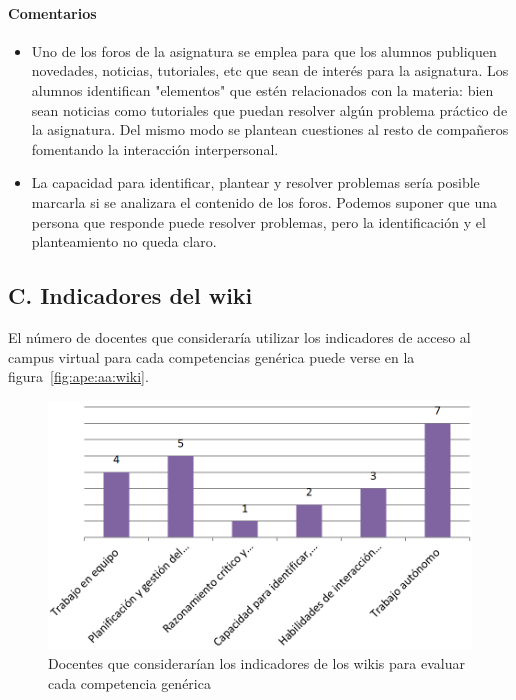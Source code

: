 \paragraph*{Comentarios}

\begin{itemize}
\item Uno de los foros de la asignatura se emplea para que los alumnos publiquen novedades, noticias, tutoriales, etc que sean de interés para la asignatura. Los alumnos identifican "elementos" que estén relacionados con la materia: bien sean noticias como tutoriales que puedan resolver algún problema práctico de la asignatura. Del mismo modo se plantean cuestiones al resto de compañeros fomentando la interacción interpersonal.
\item La capacidad para identificar, plantear y resolver problemas sería posible marcarla si se analizara el contenido de los foros. Podemos suponer que una persona que responde puede resolver problemas, pero la identificación y el planteamiento no queda claro.
\end{itemize}

	\subsection*{C. Indicadores del wiki}

El número de docentes que consideraría utilizar los indicadores de acceso al campus virtual para cada competencias genérica puede verse en la figura~\ref{fig:ape:aa:wiki}.

\begin{figure}[h]
    \includegraphics[scale=0.35]{aa_wikis.png}
  \caption{Docentes que considerarían los indicadores de los wikis para evaluar cada competencia genérica}
  \label{fig:ape:aa:wikis}
\end{figure}

